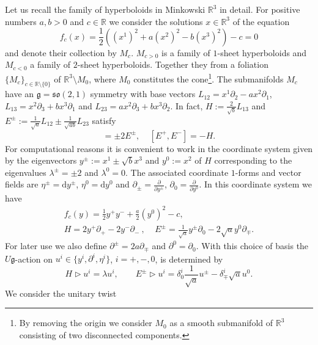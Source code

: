 \documentclass[a4paper,11pt]{article}
\begin{document}
Let us recall the family of hyperboloids in Minkowski $\mathbb{R}^3$ in detail.
For positive numbers $a,b>0$ and $c\in\mathbb{R}$ we consider the solutions
$x\in\mathbb{R}^3$ of the equation
\begin{equation}
    f_c(x)=\frac{1}{2}((x^1)^2+a(x^2)^2-b(x^3)^2)-c=0
\end{equation}
and denote their collection by $M_c$.
$M_{c>0}$ is a family of $1$-sheet hyperboloids and
$M_{c<0}$ a family of $2$-sheet hyperboloids. Together they from a foliation
$\{M_c\}_{c\in\mathbb{R}\setminus\{0\}}$ of $\mathbb{R}^3\setminus M_0$,
where $M_0$ constitutes the cone\footnote{By removing the origin we consider $M_0$ as a smooth submanifold of
$\mathbb{R}^3$ consisting of two disconnected components.}.
The submanifolds $M_c$ have an $\mathfrak{g}=\mathfrak{so}(2,1)$ symmetry with base
vectors $L_{12}=x^1\partial_2-ax^2\partial_1$,
$L_{13}=x^2\partial_3+bx^3\partial_1$ and
$L_{23}=ax^2\partial_3+bx^3\partial_2$. In fact,
$H:=\frac{2}{\sqrt{b}}L_{13}$ and
$E^\pm:=\frac{1}{\sqrt{a}}L_{12}\pm\frac{1}{\sqrt{ab}}L_{23}$ satisfy
\begin{equation}
    [H,E^\pm]=\pm2E^\pm,~~~~~[E^+,E^-]=-H.
\end{equation}
For computational reasons it is convenient to work in the coordinate system given by
the eigenvectors $y^\pm:=x^1\pm\sqrt{b}x^3$ and $y^0:=x^2$
of $H$ corresponding to the eigenvalues $\lambda^\pm=\pm 2$ and $\lambda^0=0$.
The associated coordinate $1$-forms and vector fields are
$\eta^\pm=\mathrm{d}y^\pm$, $\eta^0=\mathrm{d}y^0$ and $\partial_\pm=
\frac{\partial}{\partial y^\pm}$, $\partial_0=\frac{\partial}{\partial y^0}$.
In this coordinate system we have
\begin{equation}\label{eq15}
\begin{split}
    f_c(y)=\frac{1}{2}y^+y^-+\frac{a}{2}(y^0)^2-c,\\
    H=2y^+\partial_+-2y^-\partial_-~,~~~~~
    E^\pm=\frac{1}{\sqrt{a}}y^\pm\partial_0-2\sqrt{a}y^0\partial_\mp.
\end{split}
\end{equation}
For later use we also define $\partial^\pm=2a\partial_\mp$ and $\partial^0=\partial_0$.
With this choice of basis the $U\mathfrak{g}$-action on 
$u^i\in\{y^i,\partial^i,\eta^i\}$, $i=+,-,0$, is determined by
\begin{equation}
    H\rhd u^i=\lambda u^i,~~~~~~~~~
    E^\pm\rhd u^i=\delta_0^i\frac{1}{\sqrt{a}}u^\pm-\delta^i_\mp\sqrt{a}u^0.
\end{equation}
We consider the unitary twist 
\end{document}
